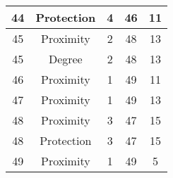 \documentclass[results.tex]{subfiles}
\begin{document}
\begin{center}
\begin{tabular}{| c || c | c | c | c |}
            \hline
            44                      & Protection                   & 4                      & 46                      & 11                   \\
            \hline
            45                      & Proximity                    & 2                      & 48                      & 13                   \\
            \hline
            45                      & Degree                       & 2                      & 48                      & 13                   \\
            \hline
            46                      & Proximity                    & 1                      & 49                      & 11                   \\
            \hline
            47                      & Proximity                    & 1                      & 49                      & 13                   \\
            \hline
            48                      & Proximity                    & 3                      & 47                      & 15                   \\
            \hline
            48                      & Protection                   & 3                      & 47                      & 15                   \\
            \hline
            49                      & Proximity                    & 1                      & 49                      & 5                    \\
            \hline
        \end{tabular}
    \end{center}
\end{document}

